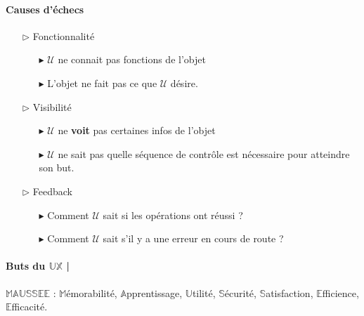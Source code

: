 \documentclass[2pt]{report}
\begin{document}
\begin{multicols*}{3}
    \paragraph{Causes d'échecs}
    \begin{itemize}
        \item[$\rhd$] Fonctionnalité 
            \begin{itemize}
                \item[$\blacktriangleright$] $\mathcal{U}$ ne connait pas fonctions de l'objet
                \item[$\blacktriangleright$] L'objet ne fait pas ce que  
                    $\mathcal{U}$ désire. 
            \end{itemize}
        \item[$\rhd$] Visibilité 
            \begin{itemize}
                \item[$\blacktriangleright$] $\mathcal{U}$ ne \textbf{voit} 
                    pas certaines infos de l'objet   
                \item[$\blacktriangleright$] 
                    $\mathcal{U}$ ne sait pas quelle séquence de contrôle est nécessaire pour 
                    atteindre son but.  
            \end{itemize}
        \item[$\rhd$] Feedback 
            \begin{itemize}
                \item[$\blacktriangleright$] Comment $\mathcal{U}$ 
                    sait si les opérations ont réussi ?
                \item[$\blacktriangleright$] 
                    Comment $\mathcal{U}$ 
                    sait s'il y a une erreur en cours de route ?
            \end{itemize}
    \end{itemize}

    \paragraph{Buts du $\mathbb{UX}$ | }
    $\mathbb{MAUSSEE}$ : $\mathbb{M}$émorabilité, 
    $\mathbb{A}$pprentissage, $\mathbb{U}$tilité,
    $\mathbb{S}$écurité, $\mathbb{S}$atisfaction, 
    $\mathbb{E}$fficience, $\mathbb{E}$fficacité. 


\end{multicols*}
\end{document}
